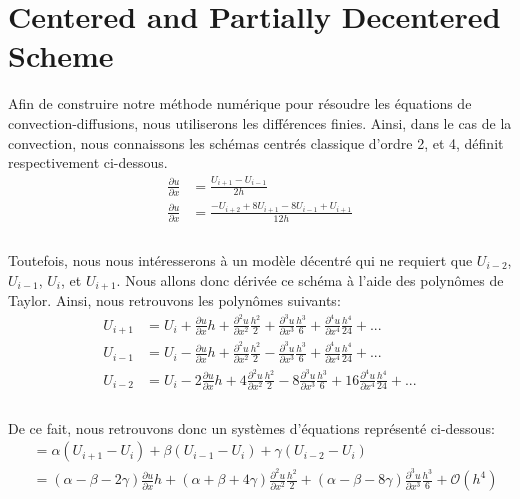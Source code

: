 \documentclass{article}
\begin{document}
\section{Centered and Partially Decentered Scheme}
Afin de construire notre méthode numérique pour résoudre les équations de convection-diffusions, nous utiliserons les différences finies. Ainsi, dans le cas de la convection, nous connaissons les schémas centrés classique d'ordre 2, et 4, définit respectivement ci-dessous.
\begin{equation}
    \begin{aligned}
        \frac{\partial u }{\partial x} & = \frac{U_{i+1} - U_{i-1}}{2h}\\
        \frac{\partial u }{\partial x} & = \frac{-U_{i+2}+8U_{i+1}-8U_{i-1}+U_{i+1}}{12h}\\
    \end{aligned}
\end{equation}
\\
Toutefois, nous nous intéresserons à un modèle décentré qui ne requiert que $U_{i-2}$, $U_{i-1}$, $U_{i}$, et $U_{i+1}$. Nous allons donc dérivée ce schéma à l'aide des polynômes de Taylor. Ainsi, nous retrouvons les polynômes suivants:\\
\begin{equation}
    \begin{aligned}
        U_{i+1} & = U_i +  \frac{\partial u }{\partial x} h +  \frac{\partial^2 u }{\partial x^2} \frac{h^2}{2} + \frac{\partial^3 u }{\partial x^3} \frac{h^3}{6} + \frac{\partial^4 u }{\partial x^4} \frac{h^4}{24} + ... \\ 
        U_{i-1} & = U_i -  \frac{\partial u }{\partial x} h +  \frac{\partial^2 u }{\partial x^2} \frac{h^2}{2} - \frac{\partial^3 u }{\partial x^3} \frac{h^3}{6} + \frac{\partial^4 u }{\partial x^4} \frac{h^4}{24} + ... \\
        U_{i-2} & = U_i - 2 \frac{\partial u }{\partial x} h + 4 \frac{\partial^2 u }{\partial x^2} \frac{h^2}{2} - 8 \frac{\partial^3 u }{\partial x^3} \frac{h^3}{6} + 16 \frac{\partial^4 u }{\partial x^4} \frac{h^4}{24} + ... \\ 
    \end{aligned}
\end{equation}
\\
De ce fait, nous retrouvons donc un systèmes d'équations représenté ci-dessous:\\
\begin{equation}
\begin{aligned}
        &= \alpha ( U_{i+1} - U_i ) +   \beta ( U_{i-1} - U_i ) +  \gamma ( U_{i-2} - U_i )   \\
        &= (\alpha-\beta-2\gamma) \frac{\partial u }{\partial x} h + (\alpha+\beta+4\gamma) \frac{\partial^2 u }{\partial x^2} \frac{h^2}{2} +  (\alpha-\beta-8\gamma)  \frac{\partial^3 u }{\partial x^3} \frac{h^3}{6} + \mathcal{O}(h^4)\\
\end{aligned}
\end{equation}
\end{document}
